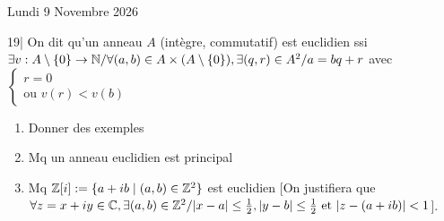 

\begin{statementbox}
Lundi 9 Novembre 2026

19| On dit qu'un anneau $A$ (intègre, commutatif) est euclidien ssi $\exists v : A \setminus \{0\} \to \mathbb N / \forall (a,b) \in A \times (A \setminus \{0\}), \exists (q,r) \in A^2 / a = bq + r$ avec $\begin{cases} r = 0 \\ \text{ou } v(r) < v(b) \end{cases}$
\begin{enumerate}[label=\alph*)]
  \item Donner des exemples
  \item Mq un anneau euclidien est principal
  \item Mq $\mathbb Z[i] := \{a+ib \mid (a,b) \in \mathbb Z^2\}$ est euclidien [On justifiera que $\forall z = x+iy \in \mathbb C, \exists (a,b) \in \mathbb Z^2 / |x-a| \leq \frac{1}{2}, |y-b| \leq \frac{1}{2} \text{ et } |z-(a+ib)| < 1$].
\end{enumerate}
\end{statementbox}

